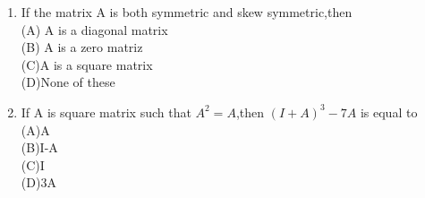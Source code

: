 \begin{enumerate}[label=\arabic*.,ref=\thesubsection.\theenumi]
\\
\solution

  \item If the matrix A is both symmetric and skew symmetric,then\\
  (A) A is a diagonal matrix \\
  (B) A is a zero matriz\\
  (C)A is a square matrix \\
  (D)None of these\\
  \item If A is square matrix such that $A^{2}=A$,then $(I+A)^{3}-7A$ is equal to\\
  (A)A \\(B)I-A\\ (C)I\\ (D)3A
  \end{enumerate}

%        
